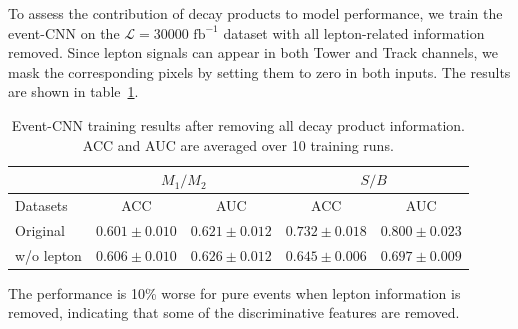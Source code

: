 \documentclass[12pt]{article}
\begin{document}
        To assess the contribution of decay products to model performance, we train the event-CNN on the $\mathcal{L} = \text{30000 fb}^{-1}$ dataset with all lepton-related information removed. Since lepton signals can appear in both Tower and Track channels, we mask the corresponding pixels by setting them to zero in both inputs. The results are shown in table~\ref{tab:CWoLa_event_CNN_training_results_30000_jet_tagging_ZZ4l_case5}.
        \begin{table}[htpb]
            \centering
            \caption{Event-CNN training results after removing all decay product information. ACC and AUC are averaged over 10 training runs.}
            \label{tab:CWoLa_event_CNN_training_results_30000_jet_tagging_ZZ4l_case5}
            \begin{tabular}{l|cc|cc}
                           & \multicolumn{2}{c|}{$M_1 / M_2$}      & \multicolumn{2}{c}{$S / B$}           \\ \hline
                Datasets   & ACC               & AUC               & ACC               & AUC               \\ \hline
                Original   & $0.601 \pm 0.010$ & $0.621 \pm 0.012$ & $0.732 \pm 0.018$ & $0.800 \pm 0.023$ \\
                w/o lepton & $0.606 \pm 0.010$ & $0.626 \pm 0.012$ & $0.645 \pm 0.006$ & $0.697 \pm 0.009$
            \end{tabular}
        \end{table}
        The performance is 10\% worse for pure events when lepton information is removed, indicating that some of the discriminative features are removed.
\end{document}
